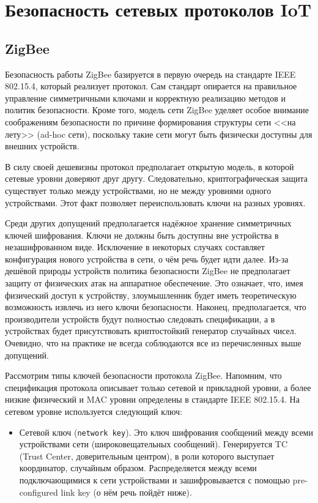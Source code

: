 \chapter{Безопасность сетевых протоколов IoT}

	\section{ZigBee}
	\label{zigbe-security section}
	
	Безопасность работы ZigBee базируется в первую очередь на стандарте IEEE 802.15.4, который реализует
	протокол. Сам стандарт опирается на правильное управление симметричными ключами и корректную 
	реализацию методов и политик безопасности. Кроме того, модель сети ZigBee уделяет особое внимание 
	соображениям безопасности по причине формирования структуры сети <<на лету>> (ad-hoc сети), 
	поскольку такие сети могут быть физически доступны для внешних устройств.
	
	В силу своей дешевизны протокол предполагает открытую модель, в которой сетевые
	уровни доверяют друг другу. Следовательно, криптографическая защита существует только между
	устройствами, но не между уровнями одного устройствами. Этот факт позволяет переиспользовать
	ключи на разных уровнях.
	
	Среди других допущений предполагается надёжное хранение симметричных ключей шифрования.
	Ключи не должны быть доступны вне устройства в незашифрованном виде. Исключение в некоторых 
	случаях составляет конфигурация нового устройства в сети, о чём речь будет идти далее. Из-за
	дешёвой природы устройств политика безопасности ZigBee не предполагает защиту от физических
	атак на аппаратное обеспечение. Это означает, что, имея физический доступ к устройству, 
	злоумышленник будет иметь теоретическую возможность извлечь из него ключи безопасности.
	Наконец, предполагается, что производители устройств будут полностью следовать спецификации,
	а в устройствах будет присутствовать криптостойкий генератор случайных чисел. Очевидно, что
	на практике не всегда соблюдаются все из перечисленных выше допущений.
	
	Рассмотрим типы ключей безопасности протокола ZigBee. Напомним, что спецификация протокола
	описывает только сетевой и прикладной уровни, а более низкие физический и MAC уровни определены
	в стандарте IEEE 802.15.4. На сетевом уровне используется следующий ключ:
	
	\begin{itemize}
		\item Сетевой ключ (\texttt{network key}). Это ключ шифрования сообщений между всеми устройствами сети 
		(широковещательных сообщений). Генерируется TC (Trust Center, доверительным центром), в роли 
		которого выступает координатор, случайным образом. Распределяется между всеми подключающимися 
		к сети устройствами и зашифровывается с помощью pre-configured link key (о нём речь пойдёт ниже).
	\end{itemize}

